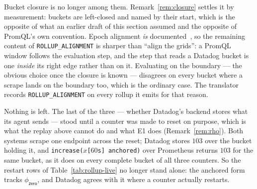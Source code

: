 Bucket closure is no longer among them. Remark~\ref{rem:closure} settles it by
measurement: buckets are left-closed and named by their start, which is the opposite of
what an earlier draft of this section assumed and the opposite of PromQL's own
convention. Epoch alignment \emph{is} documented~\citep{ddrollup}, so the remaining
content of \texttt{ROLLUP\_ALIGNMENT} is sharper than ``align the grids'': a PromQL
window follows the evaluation step, and the step that reads a Datadog bucket is one
\emph{inside} its right edge rather than on it. Evaluating on the boundary --- the
obvious choice once the closure is known --- disagrees on every bucket where a scrape
lands on the boundary too, which is the ordinary case. The translator records
\texttt{ROLLUP\_ALIGNMENT} on every rollup it emits for that reason.

Nothing is left. The last of the three --- whether Datadog's backend stores what its
agent sends --- stood until a counter was made to reset on purpose, which is what the
replay above cannot do and what E1 does (Remark~\ref{rem:rho}). Both systems scrape one
endpoint across the reset; Datadog stores $103$ over the bucket holding it, and
\texttt{increase($x$[$60$s] anchored)} over Prometheus returns $103$ for the same bucket,
as it does on every complete bucket of all three counters. So the restart rows of
Table~\ref{tab:rollup-live} no longer stand alone: the anchored form tracks
$\phi_{\mathsf{zero}}$, and Datadog agrees with it where a counter actually restarts.

